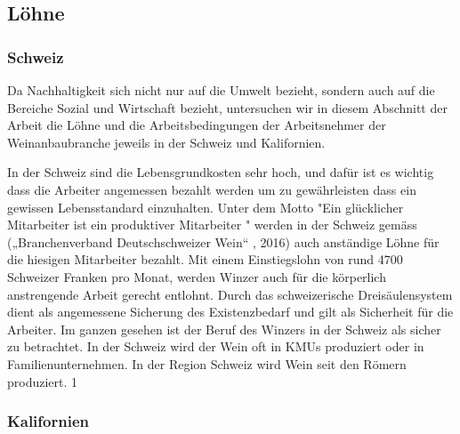 \subsection{Löhne}
\subsubsection{Schweiz}
Da Nachhaltigkeit sich nicht nur auf die Umwelt bezieht, sondern auch auf die Bereiche Sozial und Wirtschaft bezieht, untersuchen wir in diesem Abschnitt der Arbeit die Löhne und die Arbeitsbedingungen der Arbeitsnehmer der Weinanbaubranche jeweils in der Schweiz und Kalifornien.

In der Schweiz sind die Lebensgrundkosten sehr hoch, und dafür ist es wichtig dass die Arbeiter angemessen bezahlt werden um zu gewährleisten dass ein gewissen Lebensstandard einzuhalten. Unter dem Motto "Ein glücklicher Mitarbeiter ist ein produktiver Mitarbeiter " werden in der Schweiz gemäss
(„Branchenverband Deutschschweizer Wein“ , 2016) auch anständige Löhne für die hiesigen Mitarbeiter bezahlt. Mit einem Einstiegslohn von rund 4700 Schweizer Franken pro Monat, werden Winzer auch für die körperlich anstrengende Arbeit gerecht entlohnt. Durch das schweizerische Dreisäulensystem dient als angemessene Sicherung des Existenzbedarf und gilt als Sicherheit für die Arbeiter. Im ganzen gesehen ist der Beruf des Winzers in der Schweiz als sicher zu betrachtet. In der Schweiz wird der Wein oft in KMUs produziert oder in Familienunternehmen. In der Region Schweiz wird Wein seit den Römern produziert. 1

\subsubsection{Kalifornien}

